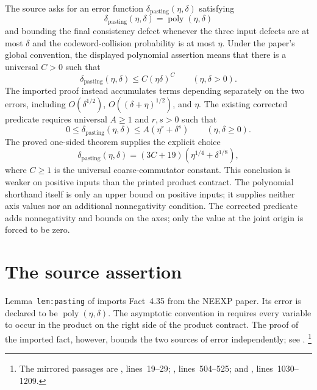 \documentclass[11pt]{article}
\begin{document}
The source asks for an error function
$\delta_{\mathrm{pasting}}(\eta,\delta)$ satisfying
\[
  \delta_{\mathrm{pasting}}(\eta,\delta)
    = \operatorname{poly}(\eta,\delta)
\]
and bounding the final consistency defect whenever the three input defects are
at most $\delta$ and the codeword-collision probability is at most $\eta$.
Under the paper's global convention, the displayed polynomial assertion means
that there is a universal $C>0$ such that
\[
  \delta_{\mathrm{pasting}}(\eta,\delta) \leq C(\eta\delta)^C
  \qquad (\eta,\delta>0).
  \tag{product contract}
\]
The imported proof instead accumulates terms depending separately on the two
errors, including $O(\delta^{1/2})$, $O((\delta+\eta)^{1/2})$, and $\eta$.
The existing corrected predicate requires universal $A\geq1$ and $r,s>0$
such that
\[
  0\leq\delta_{\mathrm{pasting}}(\eta,\delta)
    \leq A(\eta^r+\delta^s)\qquad(\eta,\delta\geq0).
  \tag{sum contract}
\]
The proved one-sided theorem supplies the explicit choice
\[
  \delta_{\mathrm{pasting}}(\eta,\delta)
    =(3C+19)(\eta^{1/4}+\delta^{1/8}),
\]
where $C\geq1$ is the universal coarse-commutator constant. This conclusion
is weaker on positive inputs than the printed product contract.
The polynomial shorthand itself is only an upper bound on positive inputs;
it supplies neither axis values nor an additional nonnegativity condition.
The corrected predicate adds nonnegativity and bounds on the axes; only
the value at the joint origin is forced to be zero.

\section{The source assertion}

Lemma~\texttt{lem:pasting} of \cite[lines~504--525]{Ji2020MIPStar} imports
Fact~4.35 from the NEEXP paper.  Its error is declared to be
$\operatorname{poly}(\eta,\delta)$.  The asymptotic convention in
\cite[lines~19--29]{Ji2020MIPStar} requires every variable to occur in the
product on the right side of the product contract.  The proof of the imported
fact, however, bounds the two sources of error independently; see
\cite[lines~1030--1209]{Natarajan2018NEEXP}.%
\footnote{The mirrored passages are
, lines~19--29;
, lines~504--525;
and ,
lines~1030--1209.}
\end{document}
